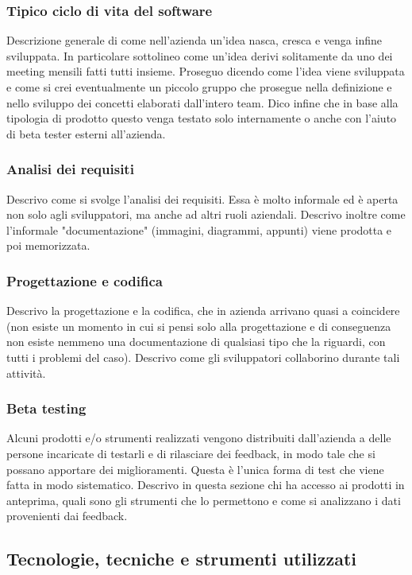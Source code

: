 			\subsubsection{Tipico ciclo di vita del software}
				Descrizione generale di come nell'azienda un'idea nasca, cresca e venga infine sviluppata. In particolare sottolineo
				come un'idea derivi solitamente da uno dei meeting mensili fatti tutti insieme. Proseguo dicendo come l'idea viene
				sviluppata e come si crei eventualmente un piccolo gruppo che prosegue nella definizione e nello sviluppo dei
				concetti elaborati dall'intero team. Dico infine che in base alla tipologia di prodotto questo venga testato solo
				internamente o anche con l'aiuto di beta tester esterni all'azienda.
			\subsubsection{Analisi dei requisiti}
				Descrivo come si svolge l'analisi dei requisiti. Essa è molto informale ed è aperta non solo agli sviluppatori, ma
				anche ad altri ruoli aziendali. Descrivo inoltre come l'informale "documentazione" (immagini, diagrammi, appunti)
				viene prodotta e poi memorizzata.
			\subsubsection{Progettazione e codifica}
				Descrivo la progettazione e la codifica, che in azienda arrivano quasi a coincidere (non esiste un momento in cui
				si pensi solo alla progettazione e di conseguenza non esiste nemmeno una documentazione di qualsiasi tipo che la
				riguardi, con tutti i problemi del caso). Descrivo come gli sviluppatori collaborino durante tali attività.
			\subsubsection{Beta testing}
				Alcuni prodotti e/o strumenti realizzati vengono distribuiti dall'azienda a delle persone incaricate di testarli
				e di rilasciare dei feedback, in modo tale che si possano apportare dei miglioramenti. Questa è l'unica forma di
				test che viene fatta in modo sistematico. Descrivo in questa sezione chi ha accesso ai prodotti in anteprima, quali
				sono gli strumenti che lo permettono e come si analizzano i dati provenienti dai feedback.
		\subsection{Tecnologie, tecniche e strumenti utilizzati}
